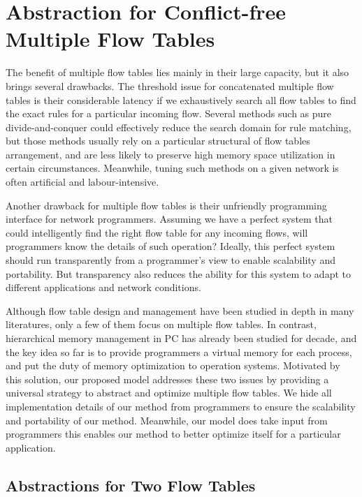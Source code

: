 \documentclass[10pt,twocolumn,letterpaper]{article}
\begin{document}
\section{Abstraction for Conflict-free Multiple Flow Tables} \label{sec:acmft}

The benefit of multiple flow tables lies mainly in their large capacity, but it also brings several drawbacks. The threshold issue for concatenated multiple flow tables is their considerable latency if we exhaustively search all flow tables to find the exact rules for a particular incoming flow. Several methods such as pure divide-and-conquer could effectively reduce the search domain for rule matching, but those methods usually rely on a particular structural of flow tables arrangement, and are less likely to preserve high memory space utilization in certain circumstances. Meanwhile, tuning such methods on a given network is often artificial and labour-intensive. 

Another drawback for multiple flow tables is their unfriendly programming interface for network programmers. Assuming we have a perfect system that could intelligently find the right flow table for any incoming flows, will programmers know the details of such operation? Ideally, this perfect system should run transparently from a programmer's view to enable scalability and portability. But transparency also reduces the ability for this system to adapt to different applications and network conditions. 

Although flow table design and management have been studied in depth in many literatures, only a few of them focus on multiple flow tables. In contrast, hierarchical memory management in PC has already been studied for decade, and the key idea so far is to provide programmers a virtual memory for each process, and put the duty of memory optimization to operation systems. Motivated by this solution, our proposed model addresses these two issues by providing a universal strategy to abstract and optimize multiple flow tables. We hide all implementation details of our method from programmers to ensure the scalability and portability of our method. Meanwhile, our model does take input from programmers \textemdash this enables our method to better optimize itself for a particular application.  

\subsection{Abstractions for Two Flow Tables}\label{sec:abs_two}
\end{document}
